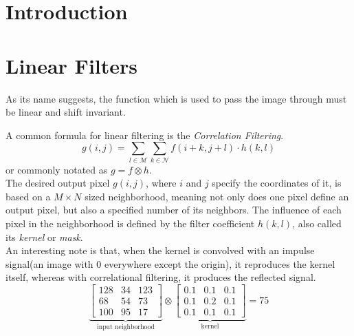\documentclass[twoside,a4paper,article]{combine}
\begin{document}


\begin{abstract}
\end{abstract}

\tableofcontents
\newpage

\section{Introduction}
\section{Linear Filters}
As its name suggests, the function which is used to pass the image through
must be linear and shift invariant.

A common formula for linear filtering is the \emph{Correlation Filtering}.
\[
    g(i,j) = \sum_{l \in \mathscr{M}}\sum_{k \in \mathscr{N}}{f(i+k, j+l) \cdot h(k, l)}
\]
or commonly notated as $g = f \otimes h$.\hfill\\

The desired output pixel $g(i, j)$, where $i$ and $j$ specify the
coordinates of it, is based on a $M \times N$ sized neighborhood, 
meaning not only does one pixel define an output pixel, but also a specified number
of its neighbors. The influence of each pixel in the neighborhood is defined by the filter coefficient $h(k, l)$,
also called its \emph{kernel} or \emph{mask}.\\

An interesting note is that, when the kernel is convolved with an impulse signal(an image with 0 everywhere except the origin),
it reproduces the kernel itself, whereas with correlational filtering, it produces the reflected signal.
$$
\underbrace{
    \begin{bmatrix}
        128 & 34 & 123\\
        68 & 54 & 73 \\
        100 & 95 & 17
    \end{bmatrix}}_{\text{input neighborhood}}
\otimes
\underbrace{
    \begin{bmatrix}
        0.1 & 0.1 & 0.1\\
        0.1 & 0.2 & 0.1\\
        0.1 & 0.1 & 0.1
    \end{bmatrix}}_{\text{kernel}}
= 75
$$
\end{document}
